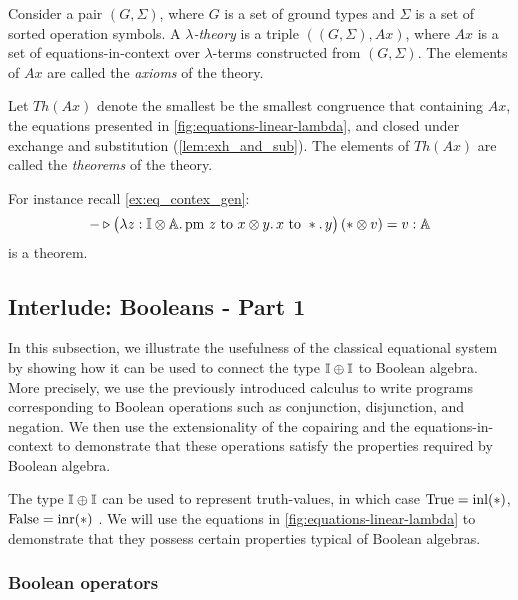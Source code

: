 \begin{definition} \label{def:linear_lambda_theory}
  Consider a pair $(G, \Sigma)$, where $G$ is a set of ground types and $\Sigma$ is a set of sorted operation symbols. A \emph{$\lambda$-theory} is a triple $((G, \Sigma), Ax)$, where $Ax$ is a set of equations-in-context over $\lambda$-terms constructed from $(G, \Sigma)$. The elements of $Ax$ are called the \emph{axioms} of the theory.
\end{definition}


 Let $Th(Ax)$ denote the smallest be the smallest
 congruence that containing $Ax$, the equations presented in \autoref{fig:equations-linear-lambda}, and closed under exchange and substitution (\autoref{lem:exh_and_sub}). The elements of $Th(Ax)$ are called the \emph{theorems} of the theory.

 For instance recall \autoref{ex:eq_contex_gen}: 
 $$ - \triangleright \big(\lambda z : \mathbb{I} \otimes \mathbb{A}.\, \text{pm } z \text{ to } x \otimes y.\, x \text{ to } *.\, y\big)\, (* \otimes v)=  v : \mathbb{A} $$
 is a theorem.

\subsection{Interlude: Booleans - Part 1} \label{subsec:interlude_bool}



In this subsection, we illustrate the usefulness of the classical equational system by showing how it can be used to connect the type $\mathbb{I} \oplus \mathbb{I}$ to Boolean algebra. More precisely, we use the previously introduced calculus to write programs corresponding to Boolean operations such as conjunction, disjunction, and negation. We then use the extensionality of the copairing and the equations-in-context to demonstrate that these operations satisfy the properties required by Boolean algebra.

The type $\mathbb{I} \oplus \mathbb{I}$ can be used to represent truth-values, in which case $\text{True} = \mathrm{inl}(*)$, $\text{False} = \mathrm{inr}(*)$ \cite{selinger2013lecture}. We will use the equations in \autoref{fig:equations-linear-lambda} to demonstrate that they possess certain properties typical of Boolean algebras.

\subsubsection{Boolean operators}

